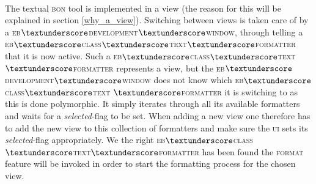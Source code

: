 \paragraph{}
The textual \textsc{bon} tool is implemented in a view (the reason for this will be explained in section \ref{why_a_view}). Switching between views is taken care of by a \textsc{eb$\textunderscore$development$\textunderscore$window}, through telling a \textsc{eb$\textunderscore$class$\textunderscore$text$\textunderscore$formatter} that it is now active. Such a \textsc{eb$\textunderscore$class$\textunderscore$text$\textunderscore$formatter} represents a view, but the \textsc{eb$\textunderscore$development$\textunderscore$window} does not know which \textsc{eb$\textunderscore$class$\textunderscore$text} \textsc{$\textunderscore$formatter} it is switching to as this is done polymorphic. It simply iterates through all its available formatters and waits for a \textit{selected}-flag to be set. When adding a new view one therefore has to add the new view to this collection of formatters and make sure the \textsc{ui} sets its \textit{selected}-flag appropriately. We the right \textsc{eb$\textunderscore$class$\textunderscore$text$\textunderscore$formatter} has been found the \textsc{format} feature will be invoked in order to start the formatting process for the chosen view.

